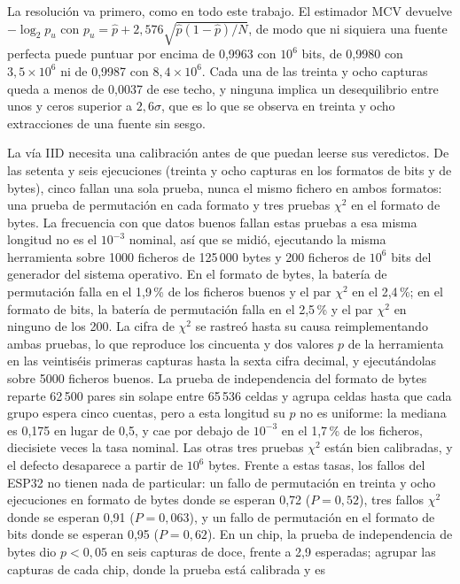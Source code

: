 La resolución va primero, como en todo este trabajo. El estimador MCV
devuelve $-\log_2 p_u$ con $p_u = \hat p + 2{,}576\sqrt{\hat p(1-\hat p)/N}$,
de modo que ni siquiera una fuente perfecta puede puntuar por encima de
0,9963 con $10^6$ bits, de 0,9980 con $3{,}5\times10^6$ ni de 0,9987 con
$8{,}4\times10^6$. Cada una de las treinta y ocho capturas queda a menos
de 0,0037 de ese techo, y ninguna implica un desequilibrio entre unos y
ceros superior a $2{,}6\sigma$, que es lo que se observa en treinta y
ocho extracciones de una fuente sin sesgo.

La vía IID necesita una calibración antes de que puedan leerse sus
veredictos. De las setenta y seis ejecuciones (treinta y ocho capturas en
los formatos de bits y de bytes), cinco fallan una sola prueba, nunca el
mismo fichero en ambos formatos: una prueba de permutación en cada formato
y tres pruebas $\chi^2$ en el formato de bytes. La frecuencia con que datos
buenos fallan estas pruebas a esa misma longitud no es el $10^{-3}$
nominal, así que se midió, ejecutando la misma herramienta sobre 1000
ficheros de 125\,000 bytes y 200 ficheros de $10^6$ bits del generador del
sistema operativo. En el formato de bytes, la batería de permutación falla
en el 1,9\,\% de los ficheros buenos y el par $\chi^2$ en el 2,4\,\%; en el
formato de bits, la batería de permutación falla en el 2,5\,\% y el par
$\chi^2$ en ninguno de los 200. La cifra de $\chi^2$ se rastreó hasta su
causa reimplementando ambas pruebas, lo que reproduce los cincuenta y dos
valores $p$ de la herramienta en las veintiséis primeras capturas hasta la sexta cifra decimal, y ejecutándolas
sobre 5000 ficheros buenos. La prueba de independencia del formato de
bytes reparte 62\,500 pares sin solape entre 65\,536 celdas y agrupa celdas
hasta que cada grupo espera cinco cuentas, pero a esta longitud su $p$ no
es uniforme: la mediana es 0,175 en lugar de 0,5, y cae por debajo de
$10^{-3}$ en el 1,7\,\% de los ficheros, diecisiete veces la tasa nominal.
Las otras tres pruebas $\chi^2$ están bien calibradas, y el defecto
desaparece a partir de $10^6$ bytes. Frente a estas tasas, los fallos del
ESP32 no tienen nada de particular: un fallo de permutación en treinta y
ocho ejecuciones en formato de bytes donde se esperan 0,72
($P = 0{,}52$), tres fallos $\chi^2$ donde se esperan 0,91
($P = 0{,}063$), y un fallo de permutación en el formato de bits donde se
esperan 0,95 ($P = 0{,}62$). En un chip, la prueba de independencia de
bytes dio $p < 0{,}05$ en seis capturas de doce, frente a 2,9 esperadas;
agrupar las capturas de cada chip, donde la prueba está calibrada y es
